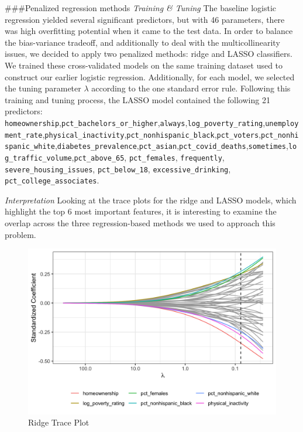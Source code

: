 \documentclass[
]{article}
\begin{document}
\#\#\#Penalized regression methods
\emph{Training \& Tuning}
The baseline logistic regression yielded several significant predictors, but with 46 parameters, there was high overfitting potential when it came to the test data. In order to balance the bias-variance tradeoff, and additionally to deal with the multicollinearity issues, we decided to apply two penalized methods: ridge and LASSO classifiers. We trained these cross-validated models on the same training dataset used to construct our earlier logistic regression. Additionally, for each model, we selected the tuning parameter \(\lambda\) according to the one standard error rule. Following this training and tuning process, the LASSO model contained the following 21 predictors:
\texttt{homeownership},\texttt{pct\_bachelors\_or\_higher},\texttt{always},\texttt{log\_poverty\_rating},\texttt{unemployment\_rate},\texttt{physical\_inactivity},\texttt{pct\_nonhispanic\_black},\texttt{pct\_voters},\texttt{pct\_nonhispanic\_white},\texttt{diabetes\_prevalence},\texttt{pct\_asian},\texttt{pct\_covid\_deaths},\texttt{sometimes},\texttt{log\_traffic\_volume},\texttt{pct\_above\_65}, \texttt{pct\_females}, \texttt{frequently}, \texttt{severe\_housing\_issues}, \texttt{pct\_below\_18}, \texttt{excessive\_drinking}, \texttt{pct\_college\_associates}.

\emph{Interpretation}
Looking at the trace plots for the ridge and LASSO models, which highlight the top 6 most important features, it is interesting to examine the overlap across the three regression-based methods we used to approach this problem.

\begin{figure}

{\centering \includegraphics[width=0.8\linewidth]{../results/ridge-trace-plot} 

}

\caption{Ridge Trace Plot}\label{fig:ridge-trace}
\end{figure}
\end{document}
